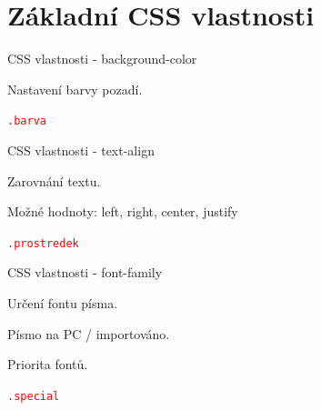 \documentclass[aspectratio=1610]{beamer}
\begin{document}
\section{Základní CSS vlastnosti}

\begin{frame}{CSS vlastnosti - background-color}
    \begin{cardTiny}
        Nastavení barvy pozadí.

        \begin{alltt}
            \textcolor{red}{.barva} \string{\\
                \textcolor{blue}{background-color}: \textcolor{orange}{white};\\
            \string}
        \end{alltt}
    \end{cardTiny}
\end{frame}

\begin{frame}{CSS vlastnosti - text-align}
    \begin{cardTiny}
        Zarovnání textu.

        Možné hodnoty: left, right, center, justify

        \begin{alltt}
            \textcolor{red}{.prostredek} \string{\\
                \textcolor{blue}{text-align}: \textcolor{orange}{center};\\
            \string}
        \end{alltt}
    \end{cardTiny}
\end{frame}

\begin{frame}{CSS vlastnosti - font-family}
    \begin{cardTiny}
        Určení fontu písma.

        Písmo na PC / importováno.

        Priorita fontů.

        \begin{alltt}
            \textcolor{red}{.special} \string{\\
                \textcolor{blue}{font-family}: \textcolor{orange}{"Times New Roman", "Roboto", serif};\\
            \string}
        \end{alltt}
    \end{cardTiny}
\end{frame}
\end{document}
